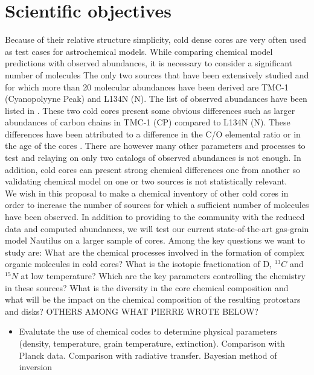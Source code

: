 \section{Scientific objectives}

Because of their relative structure simplicity, cold dense cores are very often used as test cases for astrochemical models. While comparing chemical model predictions with observed abundances, it is necessary to consider a significant number of molecules \cite{Wakelam_2006,2013ChRv..113.8710A} The only two sources that have been extensively studied and for which more than 20 molecular abundances have been derived are TMC-1 (Cyanopolyyne Peak) and L134N (N). The list of observed abundances have been listed in \cite{2013ChRv..113.8710A}. These two cold cores present some obvious differences such as larger abundances of carbon chains in TMC-1 (CP) compared to L134N (N). These differences have been attributed to a difference in the C/O elemental ratio \cite{1998ApJ...501..207T} or in the age of the cores \cite{2013ChRv..113.8710A}. There are however many other parameters and processes to test and relaying on only two catalogs of observed abundances is not enough. In addition, cold cores can present strong chemical differences one from another \cite{2006FaDi..133...63B} so validating chemical model on one or two sources is not statistically relevant.\\
We wish in this proposal to make a chemical inventory of other cold cores in order to increase the number of sources for which a sufficient number of molecules have been observed. In addition to providing to the community with the reduced data and computed abundances, we will test our current state-of-the-art gas-grain model Nautilus \cite{2015MNRAS.447.4004R} on a larger sample of cores.  Among the key questions we want to study are: What are the chemical processes involved in the formation of complex organic molecules in cold cores? What is the isotopic fractionation of D, $^{13}C$ and $^{15}N$ at low temperature? Which are the key parameters controlling the chemistry in these sources? 
What is the diversity in the core chemical composition and what will be the impact on the chemical composition of the resulting protostars and disks?  OTHERS AMONG WHAT PIERRE WROTE BELOW?

\begin{itemize}
\item{Evalutate the use of chemical codes  to determine physical parameters (density, temperature, grain temperature, extinction). Comparison with Planck data. Comparison with radiative transfer. Bayesian method of inversion}
\end{itemize}
  
  
  
  
  
  
  
  
  
  
  
  